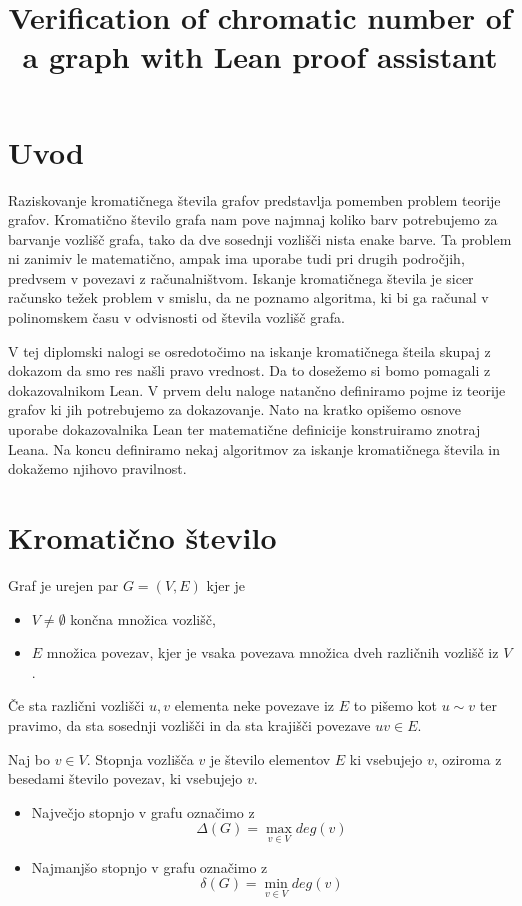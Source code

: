 \documentclass[mat1]{fmfdelo}
\title{Verification of chromatic number of a graph with Lean proof assistant}
\begin{document}
\section{Uvod}
Raziskovanje kromatičnega števila grafov predstavlja pomemben problem teorije grafov.
Kromatično število grafa nam pove najmnaj koliko barv potrebujemo za barvanje vozlišč grafa, tako da dve sosednji vozlišči nista enake barve.
Ta problem ni zanimiv le matematično, ampak ima uporabe tudi pri drugih področjih, predvsem v povezavi z računalništvom. 
Iskanje kromatičnega števila je sicer računsko težek problem v smislu, da ne poznamo algoritma, ki bi ga računal v polinomskem času v odvisnosti od števila vozlišč grafa.

V tej diplomski nalogi se osredotočimo na iskanje kromatičnega šteila skupaj z dokazom da smo res našli pravo vrednost.
Da to dosežemo si bomo pomagali z dokazovalnikom Lean.
V prvem delu naloge natančno definiramo pojme iz teorije grafov ki jih potrebujemo za dokazovanje. Nato na kratko opišemo osnove uporabe dokazovalnika
Lean ter matematične definicije konstruiramo znotraj Leana. 
Na koncu definiramo nekaj algoritmov za iskanje kromatičnega števila in dokažemo njihovo pravilnost. 

\section{Kromatično število}

\begin{definicija}
    Graf je urejen par $G=(V, E)$ kjer je 
    \begin{itemize}
      \item $V\neq \emptyset$ končna množica vozlišč,
      \item $E$ množica povezav, kjer je vsaka povezava množica dveh različnih vozlišč iz $V$. 
    \end{itemize}
\end{definicija}
Če sta različni vozlišči $u, v$ elementa neke povezave iz $E$ to pišemo kot $u\sim v$ ter pravimo, da sta sosednji vozlišči in da sta krajišči povezave $uv\in E$.

\begin{definicija}
    Naj bo $v\in V$. Stopnja vozlišča $v$ je število elementov $E$ ki vsebujejo $v$, oziroma z besedami število povezav, ki vsebujejo $v$. 
\end{definicija}

\begin{itemize}
    \item Največjo stopnjo v grafu označimo z \[\Delta (G) = \max_{v\in V} deg(v)\]
    \item Najmanjšo stopnjo v grafu označimo z \[\delta (G) = \min_{v\in V} deg(v)\]
\end{itemize}
\end{document}
